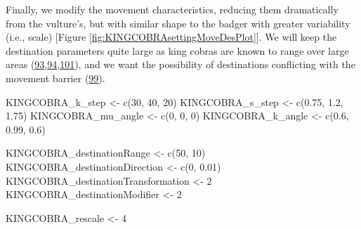 \documentclass[10pt,a4paper]{article}
\newenvironment{Shaded}{}{}
\newcommand{\DecValTok}[1]{#1}
\newcommand{\FloatTok}[1]{#1}
\newcommand{\FunctionTok}[1]{#1}
\newcommand{\NormalTok}[1]{#1}
\newcommand{\OtherTok}[1]{#1}
\begin{document}
Finally, we modify the movement characteristics, reducing them dramatically from the vulture's, but with similar shape to the badger with greater variability (i.e., scale) {[}Figure \ref{fig:KINGCOBRAsettingMoveDesPlot}{]}.
We will keep the destination parameters quite large as king cobras are known to range over large areas (\protect\hyperlink{ref-Marshall2018}{93},\protect\hyperlink{ref-marshall_no_2020}{94},\protect\hyperlink{ref-Silva2018}{101}), and we want the possibility of destinations conflicting with the movement barrier (\protect\hyperlink{ref-Marshall2018b}{99}).

\begin{Shaded}
\begin{Highlighting}[]
\NormalTok{KINGCOBRA\_k\_step }\OtherTok{\textless{}{-}} \FunctionTok{c}\NormalTok{(}\DecValTok{30}\NormalTok{, }\DecValTok{40}\NormalTok{, }\DecValTok{20}\NormalTok{)}
\NormalTok{KINGCOBRA\_s\_step }\OtherTok{\textless{}{-}} \FunctionTok{c}\NormalTok{(}\FloatTok{0.75}\NormalTok{, }\FloatTok{1.2}\NormalTok{, }\FloatTok{1.75}\NormalTok{)}
\NormalTok{KINGCOBRA\_mu\_angle }\OtherTok{\textless{}{-}} \FunctionTok{c}\NormalTok{(}\DecValTok{0}\NormalTok{, }\DecValTok{0}\NormalTok{, }\DecValTok{0}\NormalTok{)}
\NormalTok{KINGCOBRA\_k\_angle }\OtherTok{\textless{}{-}} \FunctionTok{c}\NormalTok{(}\FloatTok{0.6}\NormalTok{, }\FloatTok{0.99}\NormalTok{, }\FloatTok{0.6}\NormalTok{)}

\NormalTok{KINGCOBRA\_destinationRange }\OtherTok{\textless{}{-}} \FunctionTok{c}\NormalTok{(}\DecValTok{50}\NormalTok{, }\DecValTok{10}\NormalTok{)}
\NormalTok{KINGCOBRA\_destinationDirection }\OtherTok{\textless{}{-}} \FunctionTok{c}\NormalTok{(}\DecValTok{0}\NormalTok{, }\FloatTok{0.01}\NormalTok{)}
\NormalTok{KINGCOBRA\_destinationTransformation }\OtherTok{\textless{}{-}} \DecValTok{2}
\NormalTok{KINGCOBRA\_destinationModifier }\OtherTok{\textless{}{-}} \DecValTok{2}

\NormalTok{KINGCOBRA\_rescale }\OtherTok{\textless{}{-}} \DecValTok{4}
\end{Highlighting}
\end{Shaded}
\end{document}
